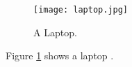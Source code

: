 \documentclass{article}
\begin{document}
	\begin{figure}
		\texttt{[image: laptop.jpg]}
		\caption{A Laptop.}
		\label{fig:laptop1}
	\end{figure}
	Figure \ref{fig:laptop1} shows a laptop .
\end{document}
